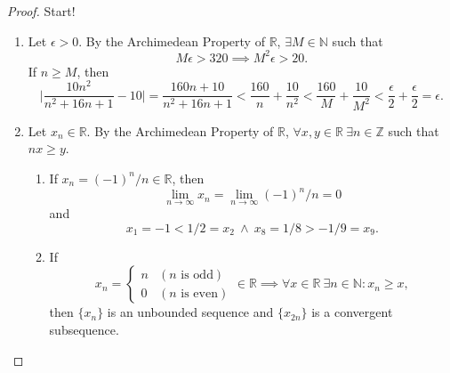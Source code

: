 \documentclass[12pt]{article}
\theoremstyle{definition}
\begin{document}
\begin{proof}
    Start!
    \begin{enumerate}[label=(\alph*)]
        \item Let \(\epsilon > 0\). By the Archimedean Property of \(\mathbb{R}\), \(\exists M \in \mathbb{N}\) such that
        \[
            M\epsilon > 320 \implies M^2\epsilon > 20.
        \]
        If \(n \geq M\), then
        \[
            \bigg\vert \frac{10n^2}{n^2 + 16n + 1} - 10 \bigg\vert = \frac{160n + 10}{n^2 + 16n + 1} < \frac{160}{n} + \frac{10}{n^2} < \frac{160}{M} + \frac{10}{M^2} < \frac{\epsilon}{2} + \frac{\epsilon}{2} = \epsilon.
        \]
        \item Let \(x_n \in \mathbb{R}\). By the Archimedean Property of \(\mathbb{R}\), \(\forall x,y \in \mathbb{R} \ \exists n \in \mathbb{Z}\) such that \(nx \geq y\).
        \begin{enumerate}[label=(\roman*)]
            \item If \(x_n = (-1)^n / n \in \mathbb{R}\), then 
            \[
                \lim_{n \to \infty}x_n = \lim_{n \to \infty}(-1)^n/n = 0
            \]
            and 
            \[
                x_1 = -1 < 1/2 = x_2 \ \land \ x_{8} = 1/8 > -1/9 = x_{9}. 
            \]
            \item If
            \[
                x_n = \begin{cases}
                    n & (\text{\(n\) is odd}) \\
                    0 & (\text{\(n\) is even})
                \end{cases} \in \mathbb{R} \implies \forall x \in \mathbb{R} \ \exists n \in \mathbb{N} : x_n \geq x, 
            \]
            then \(\{x_n\}\) is an unbounded sequence and \(\{x_{2n}\}\) is a convergent subsequence. 
        \end{enumerate}
    \end{enumerate}
\end{proof}

\newpage
\end{document}
